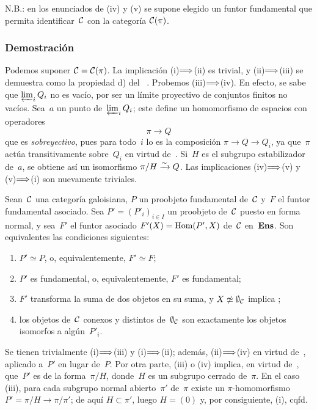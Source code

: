 N.B.: en los enunciados de (iv) y (v) se supone elegido un funtor
fundamental que permita identificar~$\cal{C}$ con la categoría
$\cal{C}(\pi)$.

\subsubsection*{Demostración} Podemos suponer
$\cal{C}=\cal{C}(\pi)$. La implicación (i)$\To$(ii) es trivial, y
(ii)$\To$(iii) se demuestra como la propiedad d) del \No~.
Probemos (iii)$\To$(iv). En efecto, se sabe que $\varprojlim_iQ_i$ no es
vacío, por ser un límite proyectivo de conjuntos finitos no vacíos. Sea~$a$
un punto de~$\varprojlim_iQ_i$; este define un homomorfismo de espacios con
operadores
$$
\pi\to Q
$$
que es \emph{sobreyectivo}, pues para todo~$i$ lo es la composición
$\pi\to Q\to Q_i$, ya que~$\pi$ actúa transitivamente sobre~$Q_i$ en virtud
de~. Si~$H$ es el subgrupo estabilizador de~$a$, se obtiene así
un isomorfismo $\pi/H\isomto Q$. Las implicaciones (iv)$\To$(v) y
(v)$\To$(i) son nuevamente triviales.

\begin{proposition}
\label{V.5.6}
Sean~$\cal{C}$ una categoría galoisiana, $P$ un proobjeto fundamental
de~$\cal{C}$ y~$F$ el funtor fundamental asociado. Sea
$P'=(P'_i)_{i\in I}$ un proobjeto de~$\cal{C}$ puesto en forma normal, y
sea~$F'$ el funtor asociado $F'(X)=\Hom(P',X)$ de~$\cal{C}$ en~$\Ens$. Son
equivalentes las condiciones siguientes:
\begin{enumerate}
\item[(i)] $P'\simeq P$, o, equivalentemente, $F'\simeq F$;
\item[(ii)] $P'$ es fundamental, o, equivalentemente, $F'$ es fundamental;
\item[(iii)] $F'$ transforma la suma de dos objetos en su suma, y
$X\not\simeq\emptyset_{\cal{C}}$ implica
;
\item[(iv)]
los objetos de~$\cal{C}$ conexos y distintos de~$\emptyset_{\cal{C}}$ son
exactamente los objetos isomorfos a algún~$P'_i$.
\end{enumerate}
\end{proposition}

Se tienen trivialmente (i)$\To$(iii) y (i)$\To$(ii); además,
(ii)$\To$(iv) en virtud de~, aplicado a~$P'$ en lugar de~$P$.
Por otra parte, (iii) o (iv) implica, en virtud de~, que~$P'$ es
de la forma~$\pi/H$, donde~$H$ es un subgrupo cerrado de~$\pi$. En el caso
(iii), para cada subgrupo normal abierto~$\pi'$ de~$\pi$ existe un
$\pi$-homomorfismo $P'=\pi/H\to\pi/\pi'$; de aquí $H\subset\pi'$, luego
$H=(0)$ y, por consiguiente, (i), cqfd.

